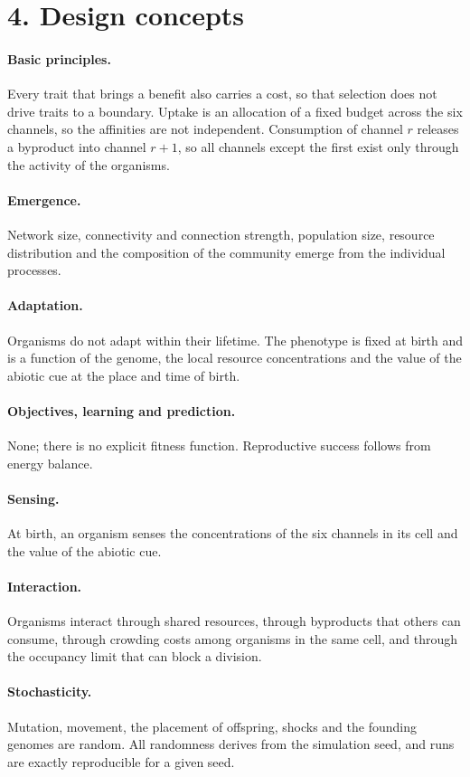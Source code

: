 \section*{4. Design concepts}
\paragraph*{Basic principles.} Every trait that brings a benefit also carries a
cost, so that selection does not drive traits to a boundary. Uptake is an allocation of a fixed budget across the six channels, so the affinities are not independent. Consumption of channel $r$ releases a byproduct into channel $r+1$,
so all channels except the first exist only through the activity of the
organisms.
\paragraph*{Emergence.} Network size, connectivity and connection strength,
population size, resource distribution and the composition of the community
emerge from the individual processes.
\paragraph*{Adaptation.} Organisms do not adapt within their lifetime. The
phenotype is fixed at birth and is a function of the genome, the local resource
concentrations and the value of the abiotic cue at the place and time of birth.
\paragraph*{Objectives, learning and prediction.} None; there is no explicit
fitness function. Reproductive success follows from energy balance.
\paragraph*{Sensing.} At birth, an organism senses the concentrations of the six
channels in its cell and the value of the abiotic cue.
\paragraph*{Interaction.} Organisms interact through shared resources, through
byproducts that others can consume, through crowding costs among organisms in the
same cell, and through the occupancy limit that can block a division.
\paragraph*{Stochasticity.} Mutation, movement, the placement of offspring,
shocks and the founding genomes are random. All randomness derives from the
simulation seed, and runs are exactly reproducible for a given seed.
